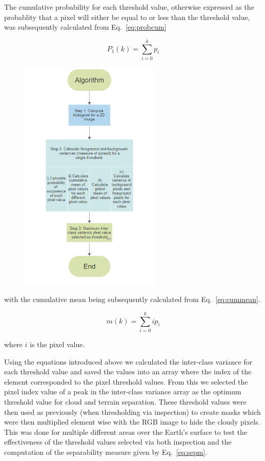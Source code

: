 \par
The cumulative probability for each threshold value, otherwise expressed as the probablity that a pixel will either be equal to or less than the threshold value, was subsequently calculated from Eq.~\ref{eq:probcum}

\begin{equation}\label{eq:probcum}
P_{1}(k)=\sum_{i=0}^{k} p_{i}
\end{equation}

\begin{figure}
    \includegraphics[width=0.6\textwidth]{flowchart_otsu.png}
    \caption{\label{fig:flowchart}}
\end{figure}

with the cumulative mean being subsequently calculated from Eq.~\ref{eq:cummean}.

\begin{equation}\label{eq:cummean}
m(k)=\sum_{i=0}^{k} i p_{i}
\end{equation}

where $i$ is the pixel value.

Using the equations introduced above we calculated the inter-class variance for each threshold value and saved the values into an array where the index of the element corresponded to the pixel threshold values. From this we selected the pixel index value of a peak in the inter-class variance array as the optimum threshold value for cloud and terrain separation. These threshold values were then used as previously (when thresholding via inspection) to create masks which were then multiplied element wise with the RGB image to hide the cloudy pixels.
This was done for multiple different areas over the Earth's surface to test the effectiveness of the threshold values selected via both inspection and the computation of the separability measure given by Eq.~\ref{eq:sepm}.

